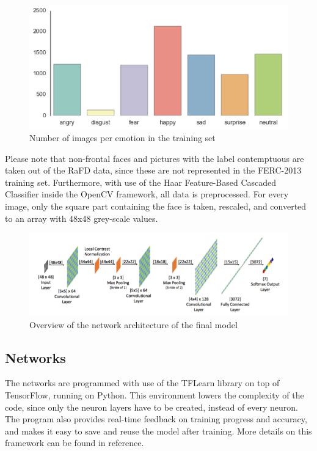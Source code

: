 \begin{figure}[h]
	\centering\includegraphics{images/fer2013.png}
	\caption{Number of images per emotion in the training set}
\end{figure}

Please note that non-frontal faces and pictures with the label contemptuous are taken out of the RaFD data, since these are not represented in the FERC-2013 training set. Furthermore, with use of the Haar Feature-Based Cascaded Classifier inside the OpenCV framework, all data is preprocessed. For every image, only the square part containing the face is taken, rescaled, and converted to an array with 48x48 grey-scale values.

\begin{figure}[h]
	\centering\includegraphics[scale=0.75]{images/network_architecture.png}
	\caption{Overview of the network architecture of the final model}
\end{figure}

\subsection{Networks}
The networks are programmed with use of the TFLearn library on top of TensorFlow, running on Python. This environment lowers the complexity of the code, since only the neuron layers have to be created, instead of every neuron. The program also provides real-time feedback on training progress and accuracy, and makes it easy to save and reuse the model after training. More details on this framework can be found in reference.

